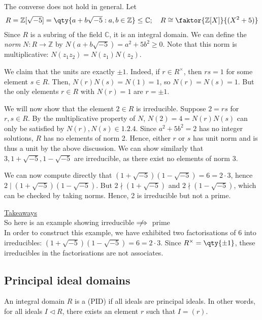 \begin{example}
	The converse does not hold in general.
	Let
	\begin{align*}
		R = \mathbb Z[\sqrt{-5}] = \qty{a+b\sqrt{-5} : a,b \in \mathbb Z} \leq \mathbb C;\quad R \cong \faktor{\mathbb Z[X]}{(X^2 + 5)}
	\end{align*}
	Since $R$ is a subring of the field $\mathbb C$, it is an integral domain.
	We can define the \textit{norm} $N : R \to \mathbb Z$ by $N(a+b\sqrt{-5}) = a^2 + 5b^2 \geq 0$.
	Note that this norm is multiplicative: $N(z_1 z_2) = N(z_1) N(z_2)$.

	We claim that the units are exactly $\pm 1$.
	Indeed, if $r \in R^\times$, then $rs = 1$ for some element $s \in R$.
	Then, $N(r) N(s) = N(1) = 1$, so $N(r) = N(s) = 1$.
	But the only elements $r \in R$ with $N(r) = 1$ are $r = \pm 1$.

	We will now show that the element $2 \in R$ is irreducible.
	Suppose $2 = rs$ for $r,s \in R$.
	By the multiplicative property of $N$, $N(2) = 4 = N(r) N(s)$ can only be satisfied by $N(r), N(s) \in \qty{1,2,4}$.
	Since $a^2 + 5b^2 = 2$ has no integer solutions, $R$ has no elements of norm 2.
	Hence, either $r$ or $s$ has unit norm and is thus a unit by the above discussion.
	We can show similarly that $3, 1 + \sqrt{-5}, 1 - \sqrt{-5}$ are irreducible, as there exist no elements of norm 3.

	We can now compute directly that $(1 + \sqrt{-5})(1-\sqrt{-5}) = 6 = 2 \cdot 3$, hence $2 \mid (1 + \sqrt{-5})(1-\sqrt{-5})$.
	But $2 \nmid (1 + \sqrt{-5})$ and $2 \nmid (1 - \sqrt{-5})$, which can be checked by taking norms.
	Hence, 2 is irreducible but not a prime.

	\underline{Takeaways} \\
	So here is an example showing irreducible $\;\not\nobreak\!\!\!\!\implies$ prime \\
	In order to construct this example, we have exhibited two factorisations of 6 into irreducibles: $(1 + \sqrt{-5})(1-\sqrt{-5}) = 6 = 2 \cdot 3$.
	Since $R^\times = \qty{\pm 1}$, these irreducibles in the factorisations are not associates.
\end{example}

\subsection{Principal ideal domains}
\begin{definition}
	An integral domain $R$ is a  (PID) if all ideals are principal ideals.
	In other words, for all ideals $I \triangleleft R$, there exists an element $r$ such that $I = (r)$.
\end{definition}


